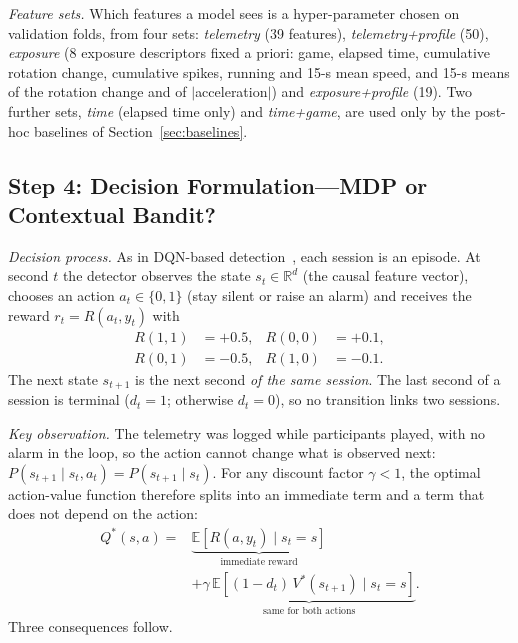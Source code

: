 \emph{Feature sets.} Which features a model sees is a hyper-parameter chosen on validation folds, from four sets: \emph{telemetry} (39 features), \emph{telemetry+profile} (50), \emph{exposure} (8 exposure descriptors fixed a priori: game, elapsed time, cumulative rotation change, cumulative spikes, running and 15-s mean speed, and 15-s means of the rotation change and of $|$acceleration$|$) and \emph{exposure+profile} (19). Two further sets, \emph{time} (elapsed time only) and \emph{time+game}, are used only by the post-hoc baselines of Section~\ref{sec:baselines}.

\subsection{Step 4: Decision Formulation---MDP or Contextual Bandit?}
\label{sec:formulation}
\emph{Decision process.} As in DQN-based detection~\cite{lin2020imbalanced,yang2024drlimbalanced}, each session is an episode. At second $t$ the detector observes the state $s_t\in\mathbb{R}^d$ (the causal feature vector), chooses an action $a_t\in\{0,1\}$ (stay silent or raise an alarm) and receives the reward $r_t=R(a_t,y_t)$ with
\begin{equation}
\begin{aligned}
R(1,1)&=+0.5, & R(0,0)&=+0.1,\\
R(0,1)&=-0.5, & R(1,0)&=-0.1.
\end{aligned}
\label{eq:reward}
\end{equation}
The next state $s_{t+1}$ is the next second \emph{of the same session}. The last second of a session is terminal ($d_t=1$; otherwise $d_t=0$), so no transition links two sessions.

\emph{Key observation.} The telemetry was logged while participants played, with no alarm in the loop, so the action cannot change what is observed next: $P(s_{t+1}\mid s_t,a_t)=P(s_{t+1}\mid s_t)$. For any discount factor $\gamma<1$, the optimal action-value function therefore splits into an immediate term and a term that does not depend on the action:
\begin{equation}
\begin{aligned}
Q^*(s,a)={}&\underbrace{\mathbb{E}[R(a,y_t)\mid s_t=s]}_{\text{immediate reward}}\\
&+\underbrace{\gamma\,\mathbb{E}[(1-d_t)\,V^*(s_{t+1})\mid s_t=s]}_{\text{same for both actions}}.
\end{aligned}
\label{eq:decomp}
\end{equation}
Three consequences follow.

